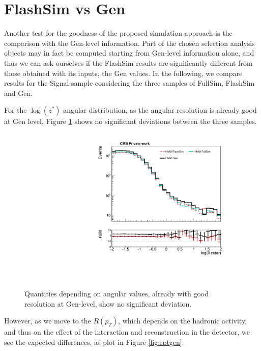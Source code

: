 \section{FlashSim vs Gen}

Another test for the goodness of the proposed simulation approach is the comparison with the Gen-level information. Part of the chosen selection analysis objects may in fact be computed starting from Gen-level information alone, and thus we can ask ourselves if the FlashSim results are significantly different from those obtained with its inputs, the Gen values. In the following, we compare results for the Signal sample considering the three samples of FullSim, FlashSim and Gen.

For the $\log(z^*)$ angular distribution, as the angular resolution is already good at Gen level, Figure \ref{fig:zstargen} shows no significant deviations between the three samples.

\begin{figure}
    \centering
    \includegraphics[width=\linewidth]{gfx/ch6/gen_vs_flash_ll_zstar_log___PreSel_log.pdf}
    \caption[Gen vs FlashSim for $z^*$]{Quantities depending on angular values, already with good resolution at Gen-level, show no significant deviation.}
    \label{fig:zstargen}
   \end{figure}
 
However, as we move to the $R(p_T)$, which depends on the hadronic activity, and thus on the effect of the interaction and reconstruction in the detector, we see the expected differences, as plot in Figure \ref{fig:rptgen}.

